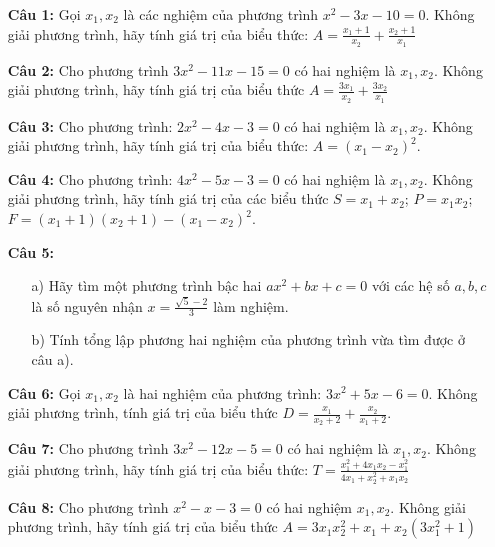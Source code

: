 \documentclass[12pt,a4paper]{extarticle}
\begin{document}
\begin{enumerate}
    \item[\textbf{Câu 1:}] Gọi $x_1, x_2$ là các nghiệm của phương trình $x^2 - 3x - 10 = 0$. Không giải phương trình, hãy tính giá trị của biểu thức: $A = \frac{x_1 + 1}{x_2} + \frac{x_2 + 1}{x_1}$
    
    \item[\textbf{Câu 2:}] Cho phương trình $3x^2 - 11x - 15 = 0$ có hai nghiệm là $x_1, x_2$. Không giải phương trình, hãy tính giá trị của biểu thức $A = \frac{3x_1}{x_2} + \frac{3x_2}{x_1}$
    
    \item[\textbf{Câu 3:}] Cho phương trình: $2x^2 - 4x - 3 = 0$ có hai nghiệm là $x_1, x_2$. Không giải phương trình, hãy tính giá trị của biểu thức: $A = (x_1 - x_2)^2$.
    
    \item[\textbf{Câu 4:}] Cho phương trình: $4x^2 - 5x - 3 = 0$ có hai nghiệm là $x_1, x_2$. Không giải phương trình, hãy tính giá trị của các biểu thức $S = x_1 + x_2$; $P = x_1 x_2$; $F = (x_1 + 1)(x_2 + 1) - (x_1 - x_2)^2$.
    
    \item[\textbf{Câu 5:}] 
    \begin{enumerate}
        \item[a)] Hãy tìm một phương trình bậc hai $ax^2 + bx + c = 0$ với các hệ số $a, b, c$ là số nguyên nhận $x = \frac{\sqrt{5} - 2}{3}$ làm nghiệm.
        \item[b)] Tính tổng lập phương hai nghiệm của phương trình vừa tìm được ở câu a).
    \end{enumerate}
    
    \item[\textbf{Câu 6:}] Gọi $x_1, x_2$ là hai nghiệm của phương trình: $3x^2 + 5x - 6 = 0$. Không giải phương trình, tính giá trị của biểu thức $D = \frac{x_1}{x_2 + 2} + \frac{x_2}{x_1 + 2}$.
    
    \item[\textbf{Câu 7:}] Cho phương trình $3x^2 - 12x - 5 = 0$ có hai nghiệm là $x_1, x_2$. Không giải phương trình, hãy tính giá trị của biểu thức: $T = \frac{x_1^2 + 4x_1 x_2 - x_1^2}{4x_1 + x_2^2 + x_1 x_2}$
    
    \item[\textbf{Câu 8:}] Cho phương trình $x^2 - x - 3 = 0$ có hai nghiệm $x_1, x_2$. Không giải phương trình, hãy tính giá trị của biểu thức $A = 3x_1 x_2^2 + x_1 + x_2(3x_1^2 + 1)$
    

\end{enumerate}
\end{document}
